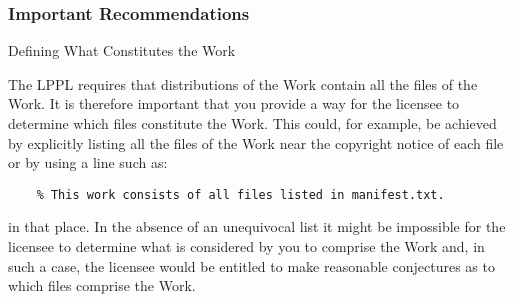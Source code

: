 \subsubsection{Important Recommendations}

 Defining What Constitutes the Work

   The LPPL requires that distributions of the Work contain all the
   files of the Work.  It is therefore important that you provide a
   way for the licensee to determine which files constitute the Work.
   This could, for example, be achieved by explicitly listing all the
   files of the Work near the copyright notice of each file or by
   using a line such as:
\begin{lstlisting}
    % This work consists of all files listed in manifest.txt.
\end{lstlisting}
   in that place.  In the absence of an unequivocal list it might be
   impossible for the licensee to determine what is considered by you
   to comprise the Work and, in such a case, the licensee would be
   entitled to make reasonable conjectures as to which files comprise
   the Work.
